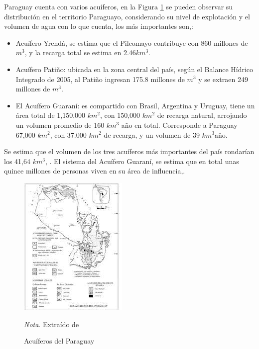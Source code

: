 Paraguay cuenta con varios acu\'iferos, en la Figura \ref{acuiferosPy} se pueden observar su distribuci\'on en el territorio Paraguayo, considerando su nivel de explotaci\'on y el volumen de agua con lo que cuenta, los m\'as importantes son,\cite{FAO_2015}:
\begin{itemize}
    \item Acu\'ifero Yrendá, se estima que el Pilcomayo contribuye con 860 millones de $m^{3}$, y la recarga total se estima en  2.46$km^{3}$.
    \item Acu\'ifero Pati\~no: ubicada en la zona central del pa\'is, según el Balance Hídrico Integrado de 2005, al Pati\~no ingresan 175.8 millones de $m^{3}$ y se extraen 249 millones de $m^{3}$. 
    \item El Acu\'ifero Guaran\'i: es compartido con Brasil, Argentina y Uruguay, tiene un área total de 1,150,000 $km^{2}$, con 150,000 
    $km^{2}$ de recarga natural, arrojando un volumen promedio de 160 
    $km^{3}$ a\~no en total. Corresponde a Paraguay 67,000 $km^{2}$, con 37.000 $km^{2}$ de recarga, y un volumen de 39 $km^{3}$a\~no. 
\end{itemize}
Se estima que el volumen de los tres acu\'iferos m\'as importantes del pa\'is rondar\'ian los 41,64 $km^{3}$, \cite{alvarez-2014}.
El sistema del Acuífero Guaraní, se estima que en total unas quince millones de personas viven en su área de influencia,\cite{salas-duenas-2015}.
\begin{figure}[ht]
    \caption {Acuíferos del Paraguay} 
    \centering
    \label{acuiferosPy}
    \includegraphics[scale=1]{Imagenes/cap2/images.jpg}\\
    \bigskip
    \raggedright
    \small \textit{Nota}. Extra\'ido de \cite{alvarez-2014} 
\end{figure}

